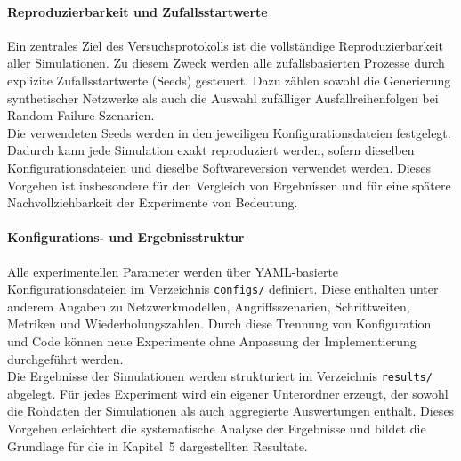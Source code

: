 \documentclass[14pt,a4paper]{scrartcl}
\begin{document}
\paragraph{Reproduzierbarkeit und Zufallsstartwerte}
Ein zentrales Ziel des Versuchsprotokolls ist die vollständige
Reproduzierbarkeit aller Simulationen. Zu diesem Zweck werden alle
zufallsbasierten Prozesse durch explizite Zufallsstartwerte (Seeds) gesteuert.
Dazu zählen sowohl die Generierung synthetischer Netzwerke als auch die
Auswahl zufälliger Ausfallreihenfolgen bei Random-Failure-Szenarien.\\
Die verwendeten Seeds werden in den jeweiligen Konfigurationsdateien
festgelegt. Dadurch kann jede Simulation exakt reproduziert werden, sofern
dieselben Konfigurationsdateien und dieselbe Softwareversion verwendet werden.
Dieses Vorgehen ist insbesondere für den Vergleich von Ergebnissen und für
eine spätere Nachvollziehbarkeit der Experimente von Bedeutung.

\paragraph{Konfigurations- und Ergebnisstruktur}
Alle experimentellen Parameter werden über YAML-basierte
Konfigurationsdateien im Verzeichnis \texttt{configs/} definiert. Diese
enthalten unter anderem Angaben zu Netzwerkmodellen, Angriffsszenarien,
Schrittweiten, Metriken und Wiederholungszahlen. Durch diese Trennung von
Konfiguration und Code können neue Experimente ohne Anpassung der
Implementierung durchgeführt werden.\\
Die Ergebnisse der Simulationen werden strukturiert im Verzeichnis
\texttt{results/} abgelegt. Für jedes Experiment wird ein eigener Unterordner
erzeugt, der sowohl die Rohdaten der Simulationen als auch aggregierte
Auswertungen enthält. Dieses Vorgehen erleichtert die systematische Analyse
der Ergebnisse und bildet die Grundlage für die in Kapitel~5 dargestellten
Resultate.




\end{document}
